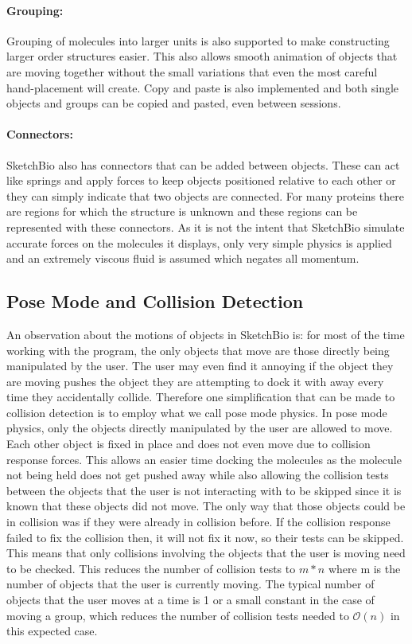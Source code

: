 \documentclass[twocolumn]{bmcart}%
\begin{document}
\paragraph*{Grouping:}
Grouping of molecules into larger units is also supported to make constructing larger order structures easier.  This also allows smooth animation of objects that are moving together without the small variations that even the most careful hand-placement will create.  Copy and paste is also implemented and both single objects and groups can be copied and pasted, even between sessions.

\paragraph*{Connectors:}
SketchBio also has connectors that can be added between objects.  These can act like springs and apply forces to keep objects positioned relative to each other or they can simply indicate that two objects are connected.  For many proteins there are regions for which the structure is unknown and these regions can be represented with these connectors.  As it is not the intent that SketchBio simulate accurate forces on the molecules it displays, only very simple physics is applied and an extremely viscous fluid is assumed which negates all momentum.

\subsection*{Pose Mode and Collision Detection}
An observation about the motions of objects in SketchBio is: for most of the time working with the program, the only objects that move are those directly being manipulated by the user.  The user may even find it annoying if the object they are moving pushes the object they are attempting to dock it with away every time they accidentally collide.  Therefore one simplification that can be made to collision detection is to employ what we call pose mode physics.  In pose mode physics, only the objects directly manipulated by the user are allowed to move.  Each other object is fixed in place and does not even move due to collision response forces.  This allows an easier time docking the molecules as the molecule not being held does not get pushed away while also allowing the collision tests between the objects that the user is not interacting with to be skipped since it is known that these objects did not move.  The only way that those objects could be in collision was if they were already in collision before.  If the collision response failed to fix the collision then, it will not fix it now, so their tests can be skipped.  This means that only collisions involving the objects that the user is moving need to be checked.  This reduces the number of collision tests to $m*n$ where m is the number of objects that the user is currently moving.  The typical number of objects that the user moves at a time is 1 or a small constant in the case of moving a group, which reduces the number of collision tests needed to $\mathcal{O}(n)$ in this expected case.
\end{document}
